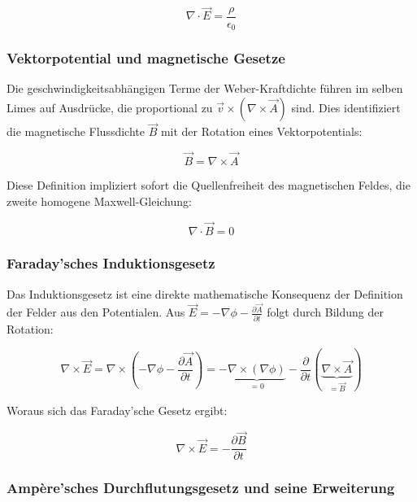 \begin{equation}
    \nabla \cdot \vec{E} = \frac{\rho}{\epsilon_0}
\end{equation}

\subsubsection{Vektorpotential und magnetische Gesetze}

Die geschwindigkeitsabhängigen Terme der Weber-Kraftdichte führen im selben Limes auf Ausdrücke, die proportional zu $\vec{v} \times (\nabla \times \vec{A})$ sind. Dies identifiziert die magnetische Flussdichte $\vec{B}$ mit der Rotation eines Vektorpotentials:

\begin{equation}
    \vec{B} = \nabla \times \vec{A}
\end{equation}

Diese Definition impliziert sofort die Quellenfreiheit des magnetischen Feldes, die zweite homogene Maxwell-Gleichung:

\begin{equation}
    \nabla \cdot \vec{B} = 0
\end{equation}

\subsubsection{Faraday'sches Induktionsgesetz}

Das Induktionsgesetz ist eine direkte mathematische Konsequenz der Definition der Felder aus den Potentialen. Aus $\vec{E} = -\nabla \phi - \frac{\partial \vec{A}}{\partial t}$ folgt durch Bildung der Rotation:

\begin{equation}
    \nabla \times \vec{E} = \nabla \times (-\nabla \phi - \frac{\partial \vec{A}}{\partial t}) = - \underbrace{\nabla \times (\nabla \phi)}_{=0} - \frac{\partial}{\partial t} (\underbrace{\nabla \times \vec{A}}_{=\vec{B}})
\end{equation}

Woraus sich das Faraday'sche Gesetz ergibt:

\begin{equation}
    \nabla \times \vec{E} = -\frac{\partial \vec{B}}{\partial t}
\end{equation}

\subsubsection{Ampère'sches Durchflutungsgesetz und seine Erweiterung}

